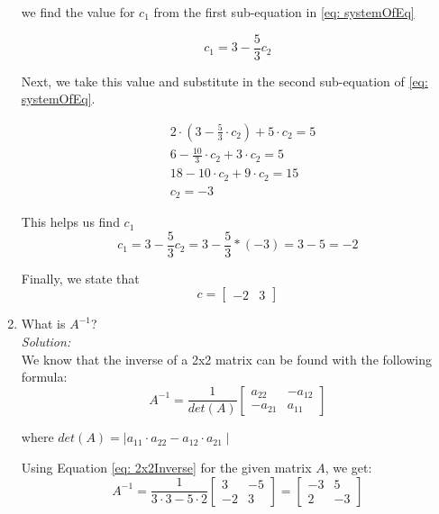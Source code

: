 \documentclass{../amsml}
\begin{document}
\begin{problem}
\begin{enumerate}
			we find the value for $c_1$ from the first sub-equation in \ref{eq: systemOfEq}
			
			\begin{equation}
				c_1 = 3 - \frac{5}{3} c_2  
			\end{equation}
			
			Next, we take this value and substitute in the second sub-equation of \ref{eq: systemOfEq}. 
			
			\begin{align*}   
				& 2 \cdot ( 3 - \frac{5}{3} \cdot c_2) + 5 \cdot c_2 = 5  \\ 
				& 6 - \frac{10}{3} \cdot c_2 + 3 \cdot c_2 = 5  \\ 
				& 18 - 10 \cdot c_2 + 9 \cdot c_2 = 15 \\
				& c_2 = -3 
			\end{align*} 
			
			This helps us find $c_1$ 
				\begin{equation}
					c_1 = 3 - \frac{5}{3} c_2 = 3 - \frac{5}{3} * (-3) = 3 - 5 = -2
				\end{equation} 
				
			Finally, we state that 
				\begin{equation} \label{eq: cValues}
					c = \begin{bmatrix} -2 & 3 \end{bmatrix}
				\end{equation} 
			
	\item What is $A^{-1}$? \\
		\emph{Solution: }  \\
			We know that the inverse of a 2x2 matrix can be found with the following formula: \\
			\begin{equation} \label{eq: 2x2Inverse}
				A^{-1} = \frac{1}{det(A)}\begin{bmatrix}a_{22} &-a_{12} \\ -a_{21} & a_{11}\end{bmatrix}
			\end{equation}
			
			where $det(A) = \mid a_{11} \cdot a_{22} - a_{12} \cdot a_{21} \mid $
			
			Using Equation \ref{eq: 2x2Inverse} for the given matrix $A$, we get:
			\begin{equation} \label{eq: aInverse}
				A^{-1} = \frac{1}{3\cdot 3 - 5\cdot 2}
			\begin{bmatrix}3 & -5  \\ -2 & 3 \end{bmatrix} = 
			\begin{bmatrix} -3& 5\\2&-3 \end{bmatrix}
			\end{equation}
			

\end{enumerate}
\end{problem}
\end{document}
